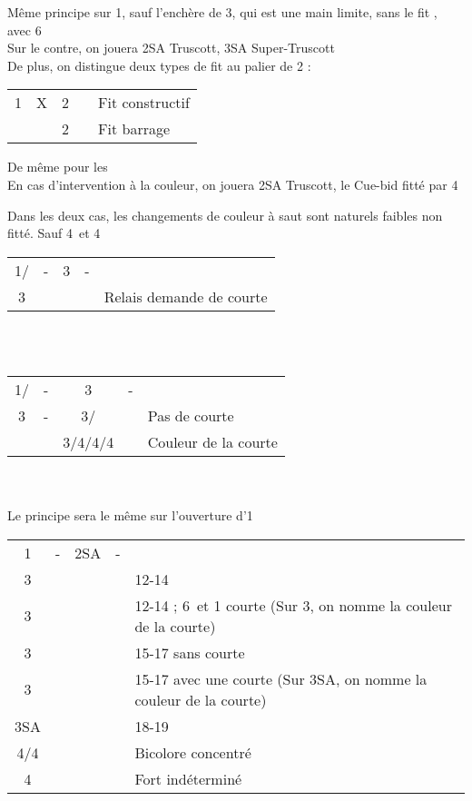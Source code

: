 \documentclass[a4paper, oneside, 11pt]{report}
\begin{document}
	Même principe sur 1\pique, sauf l'enchère de 3\coeur, qui est une main limite, sans le fit \pique, avec 6\coeur\\

		Sur le contre, on jouera 2SA Truscott, 3SA Super-Truscott\\
		De plus, on distingue deux types de fit au palier de 2 :

		\begin{tabular}{cccc|l}
		1\coeur & X & 2\carreau && Fit constructif\\
		&& 2\coeur && Fit barrage\\
		\end{tabular}
		
		De même pour les \pique\\

		En cas d'intervention à la couleur, on jouera 2SA Truscott, le Cue-bid fitté par 4
		
		Dans les deux cas, les changements de couleur à saut sont naturels faibles non fitté. Sauf 4\trefle\ et 4\carreau\\

		\begin{tabular}{cccc|l}
		1\coeur/\pique & - & 3\trefle & - &\\
		3\carreau &&&& Relais demande de courte\\
		\end{tabular}\\\\
		
		\begin{tabular}{cccc|l}
		1\coeur/\pique & - & 3\trefle & - &\\
		3\carreau & - & 3\coeur/\pique && Pas de courte\\
		&& 3\pique/4\trefle/4\carreau/4\coeur && Couleur de la courte\\
		\end{tabular}\\\\

		Le principe sera le même sur l'ouverture d'1\pique\\
		
		\begin{tabular}{cccc|l}
		1\coeur & - & 2SA & - &\\
		3\trefle &&&& 12-14\\
		3\carreau &&&& 12-14 ; 6\coeur\ et 1 courte (Sur 3\coeur, on nomme la couleur de la courte)\\
		3\coeur &&&& 15-17 sans courte\\
		3\pique &&&& 15-17 avec une courte (Sur 3SA, on nomme la couleur de la courte)\\
		3SA &&&& 18-19\\
		4\trefle/4\carreau &&&& Bicolore concentré\\
		4\coeur &&&& Fort indéterminé\\
		\end{tabular}\\\\
		
\end{document}
